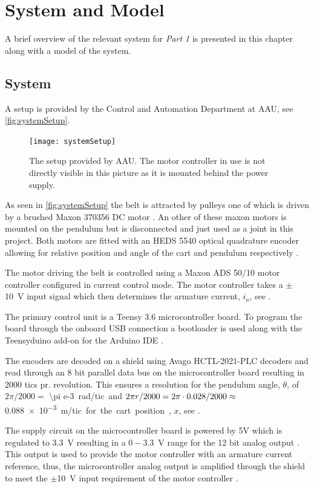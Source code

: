 %
\chapter{System and Model}\label{chap:model}
A brief overview of the relevant system for \textit{Part 1} is presented in this chapter along with a model of the system.

\section{System}\label{sec:system}
A setup is provided by the Control and Automation Department at AAU, see \autoref{fig:systemSetup}.

\begin{figure}[H]
  \texttt{[image: systemSetup]}
  \caption{The setup provided by AAU. The motor controller in use is not directly visible in this picture as it is mounted behind the power supply.}
  \label{fig:systemSetup}
\end{figure}

As seen in \autoref{fig:systemSetup} the belt is attracted by pulleys one of which is driven by a brushed Maxon 370356 DC motor \cite{maxonMotor}. An other of these maxon motors is mounted on the pendulum but is disconnected and just used as a joint in this project. Both motors are fitted with an HEDS 5540 optical quadrature encoder allowing for relative position and angle of the cart and pendulum respectively \cite{avagoTechnologies}.

The motor driving the belt is controlled using a Maxon ADS 50/10 motor controller configured in current control mode. The motor controller takes a $\pm$\SI{10}{V} input signal which then determines the armature current, $i_a$, see \cite{maxonMotorController}.

The primary control unit is a Teensy 3.6 microcontroller board. To program the board through the onboard USB connection a bootloader is used along with the Teensyduino add-on for the Arduino IDE \cite{sprkfunTeensy}.

The encoders are decoded on a shield using Avago HCTL-2021-PLC decoders and read through an 8 bit parallel data bus on the microcontroller board resulting in 2000 tics pr. revolution. This ensures a resolution for the pendulum angle, $\theta$, of $2\pi/2000=$ \SI{\pi e-3} rad/tic and $2\pi r /2000=\nolinebreak 2\pi\cdot 0.028 /2000\approx$ \SI{0.088e-3} m/tic for the cart position, $x$, see \cite{avagoDataSheet}.

The supply circuit on the microcontroller board is powered by 5V which is regulated to \SI{3.3}{V} resulting in a $0-$\SI{3.3}{V} range for the 12 bit analog output \cite{teensyDataSheet}. This output is used to provide the motor controller with an armature current reference, thus, the microcontroller analog output is amplified through the shield to meet the $\pm$\SI{10}{V} input requirement of the motor controller \cite{JHHorgensen}.

